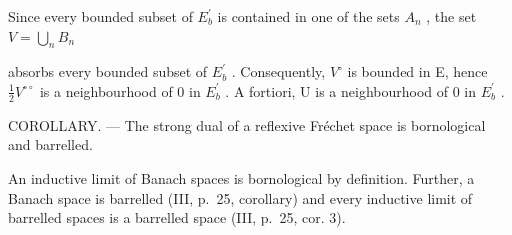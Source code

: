 Since every bounded subset of \(E_{b}^{\prime}\) is contained in one of the sets \(A_{n}\) , the set \(V = \bigcup_{n} B_{n}\)

absorbs every bounded subset of \(E_{b}^{\prime}\) . Consequently, \(V^{\circ}\) is bounded in E, hence \(\frac{1}{2}V^{\circ\circ}\) is a neighbourhood of 0 in \(E_{b}^{\prime}\) . A fortiori, U is a neighbourhood of 0 in \(E_{b}^{\prime}\) .

COROLLARY. --- The strong dual of a reflexive Fréchet space is bornological and barrelled.

An inductive limit of Banach spaces is bornological by definition. Further, a Banach space is barrelled (III, p.~25, corollary) and every inductive limit of barrelled spaces is a barrelled space (III, p.~25, cor. 3).


